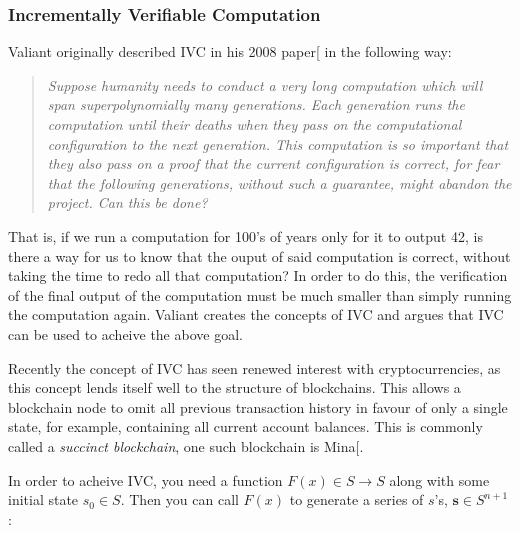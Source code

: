 \documentclass[
]{article}
\let\origfigure\figure
\let\endorigfigure\endfigure
\renewenvironment{figure}[1][2] {
    \expandafter\origfigure\expandafter[H]
} {
    \endorigfigure
}
\renewcommand{\vec}[1]{ \boldsymbol{#1} }
\begin{document}
\subsubsection{Incrementally Verifiable
Computation}\label{incrementally-verifiable-computation}

Valiant originally described IVC in his 2008
paper{[}\citeproc{ref-valiant}{Valiant 2008}{]} in the following way:

\begin{quote}
\color{GbGrey}

\textit{Suppose humanity needs to conduct a very long computation which will span
superpolynomially many generations. Each generation runs the computation
until their deaths when they pass on the computational configuration to the
next generation. This computation is so important that they also pass on a
proof that the current configuration is correct, for fear that the following
generations, without such a guarantee, might abandon the project. Can this
be done?}

\end{quote}

That is, if we run a computation for 100's of years only for it to
output 42, is there a way for us to know that the ouput of said
computation is correct, without taking the time to redo all that
computation? In order to do this, the verification of the final output
of the computation must be much smaller than simply running the
computation again. Valiant creates the concepts of IVC and argues that
IVC can be used to acheive the above goal.

Recently the concept of IVC has seen renewed interest with
cryptocurrencies, as this concept lends itself well to the structure of
blockchains. This allows a blockchain node to omit all previous
transaction history in favour of only a single state, for example,
containing all current account balances. This is commonly called a
\emph{succinct blockchain}, one such blockchain is
Mina{[}\citeproc{ref-mina}{2025}{]}.

In order to acheive IVC, you need a function \(F(x) \in S \to S\) along
with some initial state \(s_0 \in S\). Then you can call \(F(x)\) to
generate a series of \(s\)'s, \(\vec{s} \in S^{n+1}\):

\begin{figure}[!H]
\centering
{}
\caption{
  A visualisation of the relationship between $F(x)$ and $\vec{s}$ in a non-IVC setting.
}
\end{figure}
\end{document}
